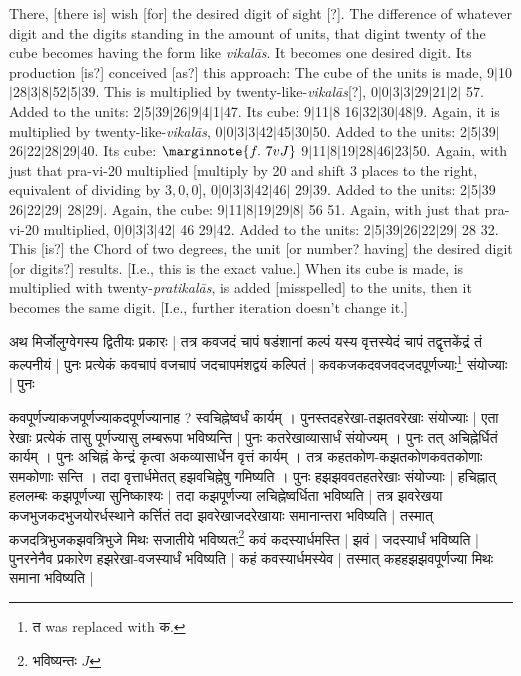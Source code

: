 \documentclass[12pt]{book}
\def\pratikalas{\textit{prati\-ka\-l\=as}}
\def\vikalas{\textit{vi\-ka\-l\=as}}
\def\danda{$|$}
\begin{document}
There, [there is] wish [for] the desired digit of sight [?].  The difference of whatever digit and the
digits standing in the amount of units, that digint twenty of the cube  becomes having the form like \vikalas. 
It becomes one desired digit. Its production [is?] conceived [as?] this approach: The cube of the 
units is made, 9\danda 10\danda 28\danda 3\danda 8\danda 52\danda 5\danda 39. 
This is multiplied by twenty-like-\vikalas [?], 0\danda 0\danda 3\danda 3\danda 29\danda 21\danda 2\danda
57. Added to the units: 2\danda 5\danda 39\danda 26\danda 9\danda 4\danda 1\danda 47.
Its cube: 9\danda 11\danda 8 16\danda 32\danda 30\danda 48\danda 9. Again, it is multiplied
by twenty-like-\vikalas, 0\danda 0\danda 3\danda 3\danda 42\danda 45\danda 30\danda 50.
Added to the units: 2\danda 5\danda 39\danda 26\danda 22\danda 28\danda 29\danda 40.
Its cube:
$\marginnote{f.~7v J} $
9\danda 11\danda 8\danda 19\danda 28\danda 46\danda 23\danda 50. 
Again, with just that pra-vi-20 multiplied [multiply by 20 and shift 3 places to the right, 
equivalent of dividing by $3,0,0$], 0\danda 0\danda 3\danda 3\danda 42\danda 46\danda
29\danda 39. Added to the units: 2\danda 5\danda 39 26\danda 22\danda 29\danda 
28\danda 29\danda. Again, the cube: 9\danda 11\danda 8\danda 19\danda 29\danda 8\danda
56 51. Again, with just that pra-vi-20 multiplied, 0\danda 0\danda 3\danda 3\danda 42\danda
46 29\danda 42. Added to the units: 2\danda 5\danda 39\danda 26\danda 22\danda 29\danda
28 32. This [is?] the Chord of two degrees, the unit [or number? having] the desired digit 
[or digits?] results. [I.e., this is the exact value.] 
When its cube is made, is multiplied with twenty-\pratikalas, is added [misspelled] to the units, then it
becomes the same digit. [I.e., further iteration doesn't change it.]

\newpage

{\s अथ मिर्जोलुग्वेगस्य द्वितीयः प्रकारः | तत्र कवजदं चापं षडंशानां कल्पं
यस्य वृत्तस्येदं चापं तद्वृत्तकेंद्रं तं कल्पनीयं | पुनः प्रत्येकं कवचापं वजचापं जदचापमंशद्वयं कल्पितं |
कवकजकदवजवदजदपूर्णज्याः\footnote{{\s त} was replaced with {\s क}.} संयोज्याः | पुनः 

कवपूर्णज्याकजपूर्णज्याकदपूर्णज्यानाह ?
स्वचिह्नेष्वर्धं कार्यम् । पुनस्तदहरेखा-तझतवरेखाः संयोज्याः | एता रेखाः प्रत्येकं तासु पूर्णज्यासु लम्बरूपा भविष्यन्ति | पुनः कतरेखाव्यासार्धं संयोज्यम् । पुनः तत् अचिह्नेर्धितं कार्यम् । पुनः अचिह्नं केन्द्रं कृत्वा
अकव्यासार्धेन वृत्तं कार्यम् । तत्र कहतकोण-कझतकोणकवतकोणाः समकोणाः सन्ति । तदा वृत्तार्धमेतत् हझवचिह्नेषु गमिष्यति । पुनः हझझववतहतरेखाः संयोज्याः | हचिह्नात् हललम्बः कझपूर्णज्या सुनिष्काश्यः $|$
तदा कझपूर्णज्या लचिह्नेष्वर्धिता भविष्यति | तत्र झवरेखया कजभुजकदभुजयोरर्धस्थाने कर्त्तितं तदा झवरेखा\-जदरेखायाः समानान्तरा भविष्यति | तस्मात् कजदत्रिभुजकझवत्रिभुजे मिथः सजातीये भविष्यतः\footnote{{\s भविष्यन्तः} $J$} कवं कदस्यार्धमस्ति | झवं | जदस्यार्धं भविष्यति |
पुनरनेनैव प्रकारेण हझरेखा-वजस्यार्धं भविष्यति | कहं कवस्यार्धमस्येव | तस्मात् कहहझझवपूर्णज्या मिथः समाना भविष्यति |}  
\end{document}
